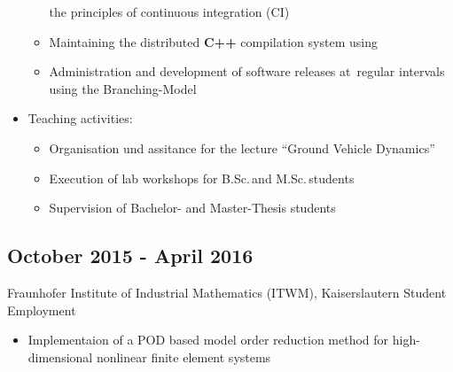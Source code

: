 \documentclass{mycv}
\begin{document}
\begin{paracol}{2}
\begin{itemize}
\begin{itemize}
					the principles of continuous integration (CI)
				\item Maintaining the distributed {\bfseries C++} compilation
					system using \href{https://github.com/distcc/distcc}{}
				\item Administration and development of software releases at \,regular
					intervals using the
					\href{https://nvie.com/posts/a-successful-git-branching-model/}{}
					Branching-Model
			\end{itemize}
			\item Teaching activities:
				\begin{itemize}
					\item Organisation und assitance for the lecture ``Ground Vehicle
						Dynamics''
					\item Execution of lab workshops for B.Sc.\,and M.Sc.\,students
					\item Supervision of Bachelor- and Master-Thesis students\\
				\end{itemize}
		\end{itemize}

\subsection{October 2015 - April 2016}{Fraunhofer Institute of Industrial
	Mathematics (ITWM), \quad\quad Kaiserslautern}
{Student Employment}
	  \begin{itemize}
			\item Implementaion of a POD based model order reduction method for
				high-dimensional nonlinear finite element systems\\
		\end{itemize}

\end{paracol}
\end{document}
